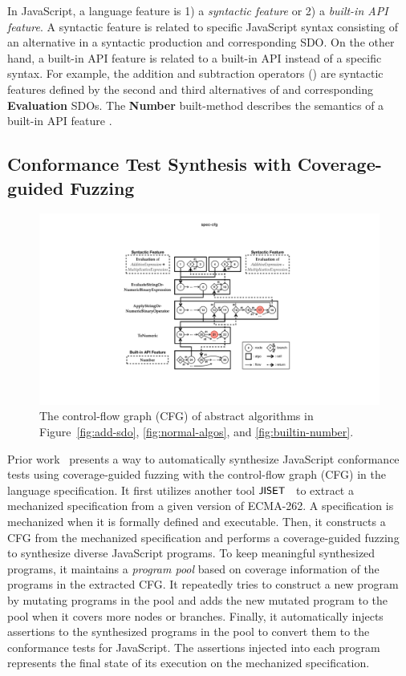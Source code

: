 In JavaScript, a language feature is 1) a \textit{syntactic feature} or 2) a
\textit{built-in API feature}.
%
A syntactic feature is related to specific JavaScript syntax consisting of an
alternative in a syntactic production and corresponding SDO.
%
On the other hand, a built-in API feature is related to a built-in API instead
of a specific syntax.
%
For example, the addition and subtraction operators (\scode{+}) are syntactic
features defined by the second and third alternatives of
 and corresponding \textbf{Evaluation} SDOs.
%
The \textbf{Number} built-method describes the semantics of a built-in API
feature .




\subsection{Conformance Test Synthesis with Coverage-guided Fuzzing}

\begin{figure}
  \centering
  \includegraphics[width=\textwidth]{img/spec-cfg}
  \caption{
    The control-flow graph (CFG) of abstract algorithms in
    Figure~\ref{fig:add-sdo}, \ref{fig:normal-algos}, and
    \ref{fig:builtin-number}.
  }
  \label{fig:spec-cfg}
\end{figure}

Prior work~\cite{jest} presents a way to automatically synthesize JavaScript
conformance tests using coverage-guided fuzzing with the control-flow graph
(CFG) in the language specification.
%
It first utilizes another tool $\textsf{\small JISET}$~\cite{jiset} to extract a mechanized
specification from a given version of ECMA-262.
%
A specification is mechanized when it is formally defined and executable.
%
Then, it constructs a CFG from the mechanized specification and performs
a coverage-guided fuzzing~\cite{afl} to synthesize diverse JavaScript programs.
%
To keep meaningful synthesized programs, it maintains a \textit{program pool}
based on coverage information of the programs in the extracted CFG.
%
It repeatedly tries to construct a new program by mutating programs in the pool
and adds the new mutated program to the pool when it covers more nodes or
branches.
%
Finally, it automatically injects assertions to the synthesized programs in the
pool to convert them to the conformance tests for JavaScript.
%
The assertions injected into each program represents the final state of its
execution on the mechanized specification.

